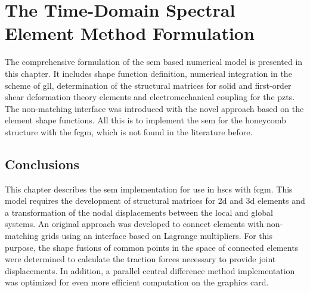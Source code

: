 
\chapter[The Time-Domain \acs{sem} Formulation]{The Time-Domain Spectral Element Method Formulation}
\label{ch:sem}
The comprehensive formulation of the \ac{sem} based numerical model is presented in this chapter.
It includes shape function definition, numerical integration in the scheme of \ac{gll}, determination of the structural matrices for solid and first-order shear deformation theory elements and electromechanical coupling for the \acp{pzt}.
The non-matching interface was introduced with the novel approach based on the element shape functions.
All this is to implement the \ac{sem} for the honeycomb structure with the \ac{fcgm}, which is not found in the literature before.











\section{Conclusions}
\label{sec:conclusionsSEM}
This chapter describes the \ac{sem} implementation for use in \acp{hsc} with \ac{fcgm}.
This model requires the development of structural matrices for \ac{2d} and \ac{3d} elements and a transformation of the nodal displacements between the local and global systems.
An original approach was developed to connect elements with non-matching grids using an interface based on Lagrange multipliers.
For this purpose, the shape fusions of common points in the space of connected elements were determined to calculate the traction forces necessary to provide joint displacements.
In addition, a parallel central difference method implementation was optimized for even more efficient computation on the graphics card.

